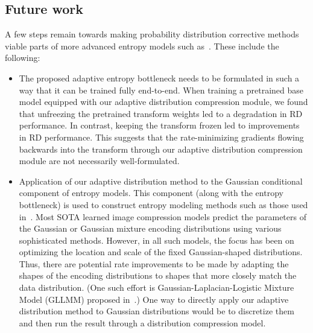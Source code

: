 \subsection{Future work}
\label{sec:pdf_compression/conclusion/future_work}

A few steps remain towards making probability distribution corrective methods viable parts of more advanced entropy models such as~\cite{balle2018variational,cheng2020learned,he2022elic}.
These include the following:
%
\begin{itemize}
  \item
    The proposed adaptive entropy bottleneck needs to be formulated in such a way that it can be trained fully end-to-end.
    When training a pretrained base model equipped with our adaptive distribution compression module, we found that unfreezing the pretrained transform weights led to a degradation in RD performance.
    In contrast, keeping the transform frozen led to improvements in RD performance.
    This suggests that the rate-minimizing gradients flowing backwards into the transform through our adaptive distribution compression module are not necessarily well-formulated.
  \item
    Application of our adaptive distribution method to the Gaussian conditional component of entropy models.
    This component (along with the entropy bottleneck) is used to construct entropy modeling methods such as those used in~\cite{balle2018variational,cheng2020learned,he2022elic}.
    Most SOTA learned image compression models predict the parameters of the Gaussian or Gaussian mixture encoding distributions using various sophisticated methods.
    However, in all such models, the focus has been on optimizing the location and scale of the fixed Gaussian-shaped distributions.
    Thus, there are potential rate improvements to be made by adapting the shapes of the encoding distributions to shapes that more closely match the data distribution.
    (One such effort is Gaussian-Laplacian-Logistic Mixture Model (GLLMM) proposed in~\cite{fu2021learned}.)
    One way to directly apply our adaptive distribution method to Gaussian distributions would be to discretize them and then run the result through a distribution compression model.
\end{itemize}




